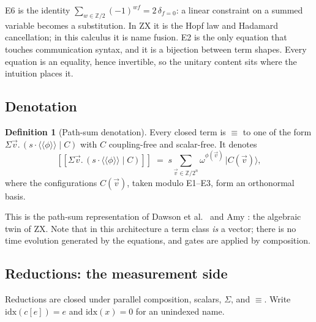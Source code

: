 \documentclass[11pt,a4paper]{article}
\theoremstyle{plain}
\theoremstyle{definition}
\newtheorem{definition}[theorem]{Definition}
\theoremstyle{remark}
\newcommand{\sem}[1]{[\![#1]\!]}
\newcommand{\ket}[1]{\lvert #1 \rangle}
\newcommand{\cpl}[1]{\langle\!\langle #1 \rangle\!\rangle}
\newcommand{\Zt}{\mathbb{Z}/2}
\newcommand{\Sig}[2]{\Sigma #1.\,#2}
\newcommand{\scong}{\equiv}
\begin{document}
E6 is the identity $\sum_{w\in\Zt}(-1)^{w f} = 2\,\delta_{f=0}$: a linear
constraint on a summed variable becomes a substitution. In ZX it is the Hopf
law and Hadamard cancellation; in this calculus it is name fusion. E2 is the
only equation that touches communication syntax, and it is a bijection between
term shapes. Every equation is an equality, hence invertible, so the unitary
content sits where the intuition places it.

\subsection{Denotation}

\begin{definition}[Path-sum denotation]\label{def:denot}
Every closed term is $\scong$ to one of the form
$\Sig{\vec v}{(s\cdot\cpl{\phi}\mid C)}$ with $C$ coupling-free and
scalar-free. It denotes
\[
  \sem{\Sig{\vec v}{(s\cdot\cpl{\phi}\mid C)}}
  \;=\; s\sum_{\vec v\in\Zt^n}\omega^{\phi(\vec v)}\,\ket{C(\vec v)},
\]
where the configurations $C(\vec v)$, taken modulo E1--E3, form an orthonormal
basis.
\end{definition}

This is the path-sum representation of Dawson et al.\ \cite{Dawson} and Amy
\cite{Amy}: the algebraic twin of ZX. Note that in this architecture a term
class \emph{is} a vector; there is no time evolution generated by the
equations, and gates are applied by composition.

\subsection{Reductions: the measurement side}

Reductions are closed under parallel composition, scalars, $\Sigma$, and
$\scong$. Write $\mathrm{idx}(c[e]) = e$ and $\mathrm{idx}(x) = 0$ for an
unindexed name.
\end{document}
